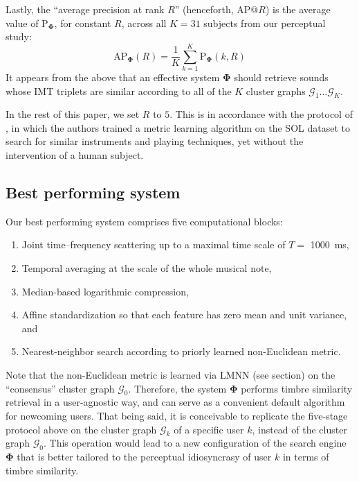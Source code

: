 \documentclass{bmcart}
\newcommand{\lnameref}[1]{%
\bgroup
\let\nmu\MakeLowercase
\nameref{#1}\egroup}
\newcommand{\nmu}{}
\begin{document}
Lastly, the ``average precision at rank $R$'' (henceforth, AP@$R$) is the average value of $\mathrm{P}_{\mathbf{\Phi}}$, for constant $R$, across all $K=31$ subjects from our perceptual study:
\begin{equation}
\mathrm{AP}_{\mathbf{\Phi}}(R) =
\dfrac{1}{K}
\sum_{k=1}^{K}
\mathrm{P}_{\mathbf{\Phi}}(k, R)
\end{equation}
It appears from the above that an effective system $\mathbf{\Phi}$ should retrieve sounds whose IMT triplets are similar according to all of the $K$ cluster graphs $\mathcal{G}_1 \ldots \mathcal{G}_K$.

In the rest of this paper, we set $R$ to $5$.
This is in accordance with the protocol of \cite{lostanlen2018extended}, in which the authors trained a metric learning algorithm on the SOL dataset to search for similar instruments and playing techniques, yet without the intervention of a human subject.


\subsection*{Best performing system}
Our best performing system comprises five computational blocks:

\begin{enumerate}
\item Joint time--frequency scattering up to a maximal time scale of $T=$ \SI{1000}{\milli\second},
\item Temporal averaging at the scale of the whole musical note,
\item Median-based logarithmic compression,
\item Affine standardization so that each feature has zero mean and unit variance, and
\item Nearest-neighbor search according to priorly learned non-Euclidean metric.
\end{enumerate}

Note that the non-Euclidean metric is learned via LMNN (see \lnameref{sec:methods} section) on the ``consensus'' cluster graph $\mathcal{G}_0$.
Therefore, the system $\mathbf{\Phi}$ performs timbre similarity retrieval in a user-agnostic way, and can serve as a convenient default algorithm for newcoming users.
That being said, it is conceivable to replicate the five-stage protocol above on the cluster graph $\mathcal{G}_k$ of a specific user $k$, instead of the cluster graph $\mathcal{G}_0$.
This operation would lead to a new configuration of the search engine $\mathbf{\Phi}$ that is better tailored to the perceptual idiosyncrasy of user $k$ in terms of timbre similarity.
\end{document}
